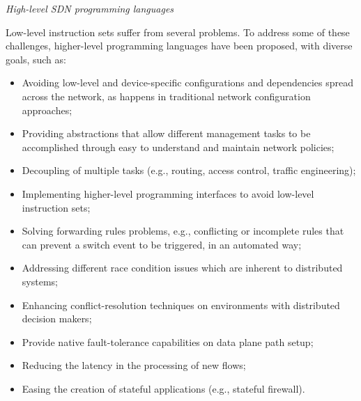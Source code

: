 \vspace{2mm}
\noindent \textit{High-level SDN programming languages}


Low-level instruction sets suffer from several problems.
To address some of these challenges, higher-level programming languages have been proposed, with 
diverse goals, such as:
\begin{itemize}
\item Avoiding low-level and device-specific configurations and dependencies spread across the network, as happens
in traditional network configuration approaches; 
\item Providing abstractions that allow different management tasks to be accomplished through easy to understand and maintain network policies;
\item Decoupling of multiple tasks (e.g., routing, access control, traffic engineering);
\item Implementing higher-level programming interfaces to avoid low-level instruction sets;
\item Solving forwarding rules problems, e.g., conflicting or incomplete rules that can prevent a switch event to be triggered, in an automated way;
\item Addressing different race condition issues which are inherent to distributed systems;
\item Enhancing conflict-resolution techniques on environments with distributed decision makers;
\item Provide native fault-tolerance capabilities on data plane path setup;
\item Reducing the latency in the processing of new flows;
\item Easing the creation of stateful applications (e.g., stateful firewall).
\end{itemize}


